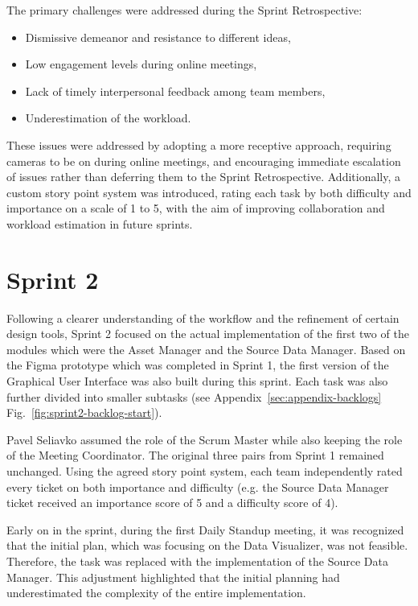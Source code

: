 The primary challenges were addressed during the Sprint Retrospective:
\begin{itemize}
    \item Dismissive demeanor and resistance to different ideas,
    \item Low engagement levels during online meetings,
    \item Lack of timely interpersonal feedback among team members,
    \item Underestimation of the workload.
\end{itemize}

These issues were addressed by adopting a more receptive approach, requiring cameras to be on during online meetings, and encouraging immediate escalation of issues rather than deferring them to the Sprint Retrospective. Additionally, a custom story point system was introduced, rating each task by both difficulty and importance on a scale of 1 to 5, with the aim of improving collaboration and workload estimation in future sprints.

\section{Sprint 2}
\label{sec:sprint2}

Following a clearer understanding of the workflow and the refinement of certain design tools, Sprint 2 focused on the actual implementation of the first two of the modules which were the Asset Manager and the Source Data Manager. Based on the Figma prototype which was completed in Sprint 1, the first version of the Graphical User Interface was also built during this sprint. Each task was also further divided into smaller subtasks (see Appendix~\ref{sec:appendix-backlogs} Fig.~\ref{fig:sprint2-backlog-start}).

Pavel Seliavko assumed the role of the Scrum Master while also keeping the role of the Meeting Coordinator. The original three pairs from Sprint 1 remained unchanged. Using the agreed story point system, each team independently rated every ticket on both importance and difficulty (e.g. the Source Data Manager ticket received an importance score of 5 and a difficulty score of 4).

Early on in the sprint, during the first Daily Standup meeting, it was recognized that the initial plan, which was focusing on the Data Visualizer, was not feasible. Therefore, the task was replaced with the implementation of the Source Data Manager. This adjustment highlighted that the initial planning had underestimated the complexity of the entire implementation.

